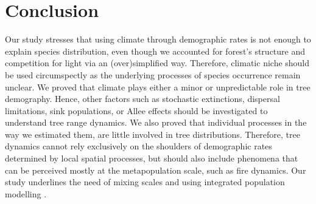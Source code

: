 \section{Conclusion}
Our study stresses that using climate through demographic rates is not enough to explain species distribution, even though we accounted for forest's structure and competition for light via an (over)simplified way. Therefore, climatic niche should be used circumspectly as the underlying processes of species occurrence remain unclear. We proved that climate plays either a minor or unpredictable role in tree demography. Hence, other factors such as stochastic extinctions, dispersal limitations, sink populations, or Allee effects \citep[and references therein]{Holt2005} should be investigated to understand tree range dynamics. We also proved that individual processes in the way we estimated them, are little involved in tree distributions. Therefore, tree dynamics cannot rely exclusively on the shoulders of demographic rates determined by local spatial processes, but should also include phenomena that can be perceived mostly at the metapopulation scale, such as fire dynamics. Our study underlines the need of mixing scales and using integrated population modelling \citep{Isaac2020}.
